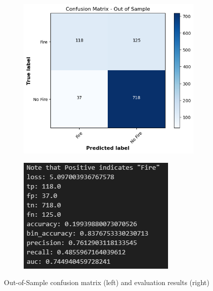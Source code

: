 \documentclass[a4paper,11pt]{article} %
\begin{document}
\begin{figure}[h]
    \centering
    \begin{subfigure}[b]{0.45\textwidth}
        \centering
        \includegraphics[width=\textwidth]{../figures/oos_confusion_matrix.png}
    \end{subfigure}
    \hfill
    \begin{subfigure}[b]{0.45\textwidth}
        \centering
        \includegraphics[width=\textwidth]{../figures/oos_results.png}
    \end{subfigure}
    \caption{Out-of-Sample confusion matrix (left) and evaluation results (right)}
    \label{fig:oos_results}
\end{figure}
\end{document}
